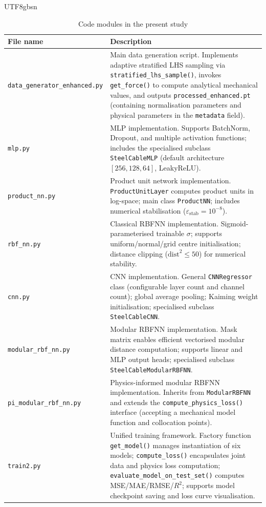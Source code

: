 \documentclass[a4paper,12pt]{report}
\begin{document}
\begin{CJK}{UTF8}{gbsn}
\begin{table}[H]
  \centering
  \caption{Code modules in the present study}
  \label{tab:code_modules}
  \begin{tabularx}{\textwidth}{lX}
    \toprule
    \textbf{File name} & \textbf{Description} \\
    \midrule
    \texttt{data\_generator\_enhanced.py} &
      Main data generation script. Implements adaptive stratified LHS sampling
      via \texttt{stratified\_lhs\_sample()}, invokes \texttt{get\_force()} to compute
      analytical mechanical values, and outputs \texttt{processed\_enhanced.pt}
      (containing normalisation parameters and physical parameters in the \texttt{metadata}
      field). \\[4pt]
    \texttt{mlp.py} &
      MLP implementation. Supports BatchNorm, Dropout, and multiple activation functions;
      includes the specialised subclass \texttt{SteelCableMLP} (default architecture
      $[256,128,64]$, LeakyReLU). \\[4pt]
    \texttt{product\_nn.py} &
      Product unit network implementation. \texttt{ProductUnitLayer} computes product
      units in log-space; main class \texttt{ProductNN}; includes numerical stabilisation
      ($\varepsilon_{\text{stab}} = 10^{-8}$). \\[4pt]
    \texttt{rbf\_nn.py} &
      Classical RBFNN implementation. Sigmoid-parameterised trainable $\sigma$; supports
      uniform/normal/grid centre initialisation; distance clipping ($\text{dist}^2 \leq 50$)
      for numerical stability. \\[4pt]
    \texttt{cnn.py} &
      CNN implementation. General \texttt{CNNRegressor} class (configurable layer count and
      channel count); global average pooling; Kaiming weight initialisation; specialised
      subclass \texttt{SteelCableCNN}. \\[4pt]
    \texttt{modular\_rbf\_nn.py} &
      Modular RBFNN implementation. Mask matrix enables efficient vectorised modular
      distance computation; supports linear and MLP output heads; specialised subclass
      \texttt{SteelCableModularRBFNN}. \\[4pt]
    \texttt{pi\_modular\_rbf\_nn.py} &
      Physics-informed modular RBFNN implementation. Inherits from \texttt{ModularRBFNN}
      and extends the \texttt{compute\_physics\_loss()} interface (accepting a mechanical
      model function and collocation points). \\[4pt]
    \texttt{train2.py} &
      Unified training framework. Factory function \texttt{get\_model()} manages
      instantiation of six models; \texttt{compute\_loss()} encapsulates joint data and
      physics loss computation; \texttt{evaluate\_model\_on\_test\_set()} computes
      MSE/MAE/RMSE/$R^2$; supports model checkpoint saving and loss curve visualisation. \\
    \bottomrule
  \end{tabularx}
\end{table}

\end{CJK}
\end{document}

